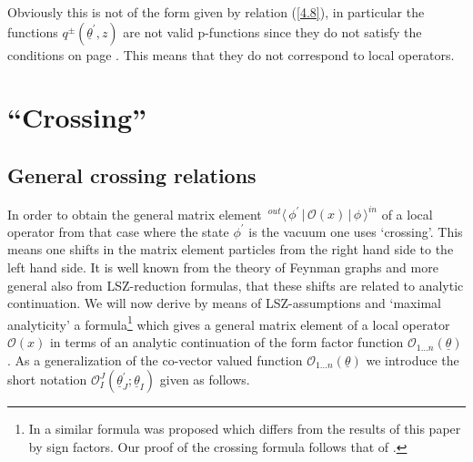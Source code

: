 \documentclass[a4paper,a4paper]{article}
\begin{document}
Obviously this is not of the form given by relation (\ref{4.8}), in
particular the functions $q^{\pm }(\underline{\theta }^{\prime },{z})$ are
not valid p-functions since they do not satisfy the conditions on page 
\pageref{p}. This means that they do not correspond to local operators.

\section{``Crossing''}

\label{s5}

\subsection{General crossing relations}

In order to obtain the general matrix element $\,^{out}\langle \,\phi
^{\prime }\,|\,\mathcal{O}(x)\,|\,\phi \,\rangle ^{in}$ of a local operator
from that case where the state $\phi ^{\prime }$ is the vacuum one uses
`crossing'. This means one shifts in the matrix element particles from the
right hand side to the left hand side. It is well known from the theory of
Feynman graphs and more general also from LSZ-reduction formulas, that these
shifts are related to analytic continuation. We will now derive by means of
LSZ-assumptions and `maximal analyticity' a formula\footnote{%
In \cite{Sm} a similar formula was proposed which differs from the results
of this paper by sign factors. Our proof of the crossing formula follows
that of \cite{Q}.} which gives a general matrix element of a local operator $%
\mathcal{O}(x)$ in terms of an analytic continuation of the form factor
function $\mathcal{O}_{1\dots n}(\underline{\theta })$. As a generalization
of the co-vector valued function $\mathcal{O}_{1\dots n}(\underline{\theta }%
) $ we introduce the short notation $\mathcal{O}_{I}^{J}(\underline{\theta }%
_{J}^{\prime };\underline{\theta }_{I})$ given as follows.
\end{document}
